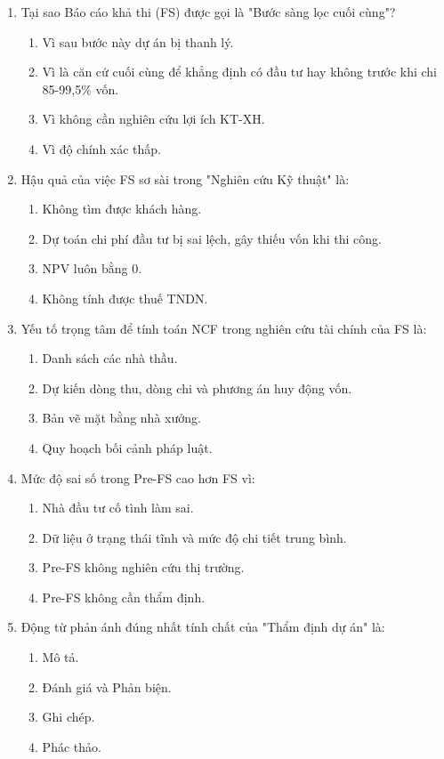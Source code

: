 \begin{enumerate}[label=\textbf{Câu \arabic*:}, leftmargin=*, resume]
\item Tại sao Báo cáo khả thi (FS) được gọi là "Bước sàng lọc cuối cùng"?
\begin{enumerate}[label=\Alph*.]
    \item Vì sau bước này dự án bị thanh lý.
    \item Vì là căn cứ cuối cùng để khẳng định có đầu tư hay không trước khi chi 85-99,5\% vốn.
    \item Vì không cần nghiên cứu lợi ích KT-XH.
    \item Vì độ chính xác thấp.
\end{enumerate}

\item Hậu quả của việc FS sơ sài trong "Nghiên cứu Kỹ thuật" là:
\begin{enumerate}[label=\Alph*.]
    \item Không tìm được khách hàng.
    \item Dự toán chi phí đầu tư bị sai lệch, gây thiếu vốn khi thi công.
    \item NPV luôn bằng 0.
    \item Không tính được thuế TNDN.
\end{enumerate}

\item Yếu tố trọng tâm để tính toán NCF trong nghiên cứu tài chính của FS là:
\begin{enumerate}[label=\Alph*.]
    \item Danh sách các nhà thầu.
    \item Dự kiến dòng thu, dòng chi và phương án huy động vốn.
    \item Bản vẽ mặt bằng nhà xưởng.
    \item Quy hoạch bối cảnh pháp luật.
\end{enumerate}

\item Mức độ sai số trong Pre-FS cao hơn FS vì:
\begin{enumerate}[label=\Alph*.]
    \item Nhà đầu tư cố tình làm sai.
    \item Dữ liệu ở trạng thái tĩnh và mức độ chi tiết trung bình.
    \item Pre-FS không nghiên cứu thị trường.
    \item Pre-FS không cần thẩm định.
\end{enumerate}

\item Động từ phản ánh đúng nhất tính chất của "Thẩm định dự án" là:
\begin{enumerate}[label=\Alph*.]
    \item Mô tả. \item Đánh giá và Phản biện. \item Ghi chép. \item Phác thảo.
\end{enumerate}


\end{enumerate}
